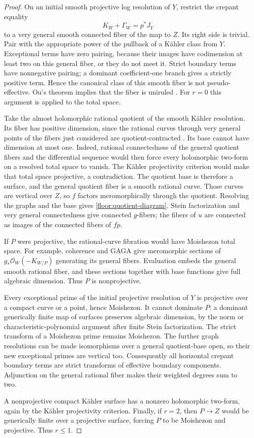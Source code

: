 \documentclass[11pt,letterpaper]{article}
\theoremstyle{definition}
\theoremstyle{remark}
\begin{document}
\begin{proof}
On an initial smooth projective log resolution of $Y$, restrict the
crepant equality
\[
 K_W+\Gamma_W=p^*J_Y
\]
to a very general smooth connected fiber of the map to $Z$.
Its right side is trivial.  Pair with the appropriate power of the
pullback of a K\"ahler class from $Y$.  Exceptional terms have zero
pairing, because their images have codimension at least two on this
general fiber, or they do not meet it.  Strict boundary terms have
nonnegative pairing; a dominant coefficient-one branch gives a
strictly positive term.  Hence the canonical class of this smooth
fiber is not pseudo-effective.  Ou's theorem implies that the
fiber is uniruled \cite{OuUniruledness}.  For $r=0$ this argument is
applied to the total space.

Take the almost holomorphic rational quotient of the smooth
K\"ahler resolution.  Its fiber has positive dimension, since the
rational curves through very general points of the fibers just
considered are quotient-contracted
\cite{CampanaRationalQuotient}.  Its base cannot have dimension
at most one.  Indeed, rational connectedness of the general quotient
fibers and the differential sequence would then force every
holomorphic two-form on a resolved total space to vanish.  The
K\"ahler projectivity criterion would make that total space
projective, a contradiction.  The quotient base is therefore a
surface, and the general quotient fiber is a smooth rational curve.
Those curves are vertical over $Z$, so $f$ factors meromorphically
through the quotient.  Resolving the graphs and the base gives
\eqref{floor:quotient-diagram}.  Stein factorization and very
general connectedness give connected $g$-fibers; the fibers of $u$
are connected as images of the connected fibers of $fp$.

If $P$ were projective, the rational-curve fibration would have
Moishezon total space.  For example, coherence and GAGA give
meromorphic sections of $g_*\mathcal{O}_W(-K_{W/P})$ generating its general
fibers.  Evaluation embeds the general smooth rational fiber, and
these sections together with base functions give full algebraic
dimension.  Thus $P$ is nonprojective.

Every exceptional prime of the initial projective resolution of
$Y$ is projective over a compact curve or a point, hence Moishezon.
It cannot dominate $P$: a dominant generically finite map of
surfaces preserves algebraic dimension, by the norm or
characteristic-polynomial argument after finite Stein
factorization.  The strict transform of a Moishezon prime remains
Moishezon.  The further graph resolutions can be made isomorphisms
over a general quotient-base open, so their new exceptional primes
are vertical too.  Consequently all horizontal crepant boundary
terms are strict transforms of effective boundary components.
Adjunction on the general rational fiber makes their weighted
degrees sum to two.

A nonprojective compact K\"ahler surface has a nonzero holomorphic
two-form, again by the K\"ahler projectivity criterion.  Finally,
if $r=2$, then $P\to Z$ would be generically finite over a
projective surface, forcing $P$ to be Moishezon and projective.
Thus $r\le1$.
\end{proof}
\end{document}
